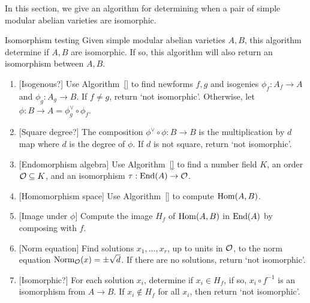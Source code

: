 In this section, we give an algorithm for determining when a pair of simple
modular abelian varieties are isomorphic.

\begin{algorithm}{Isomorphism testing}%
    \label{alg:isomorphism_testing}
    Given simple modular abelian varieties $A, B$, this algorithm determine if
    $A, B$ are isomorphic. If so, this algorithm will also return an
    isomorphism between $A, B$.
    \begin{enumerate}
        \item{}
            [Isogenous?] Use Algorithm~\ref{} to find newforms $f,g$ and
            isogenies $\phi_f:A_f\to A$ and $\phi_g:A_g\to B$. If $f\neq g$,
            return `not isomorphic'. Otherwise, let $\phi:B\to A=\phi_g ^\vee
            \circ \phi_f$.
        \item{}
            [Square degree?] The composition $\phi^\vee \circ \phi:B\to B$ is
            the multiplication by $d$ map where $d$ is the degree of $\phi$. If
            $d$ is not square, return `not isomorphic'.
        \item{}
            [Endomorphism algebra] Use Algorithm~\ref{} to find a number field
            $K$, an order $\mathcal{O}\subseteq K$, and an isomorphism $\tau:\operatorname{End}(A)\to
            \mathcal{O}$.
        \item{}
            [Homomorphism space] Use Algorithm~\ref{} to compute $\operatorname{Hom}(A,B)$.
        \item{}
            [Image under $\phi$] Compute the image $H_f$ of $\operatorname{Hom}(A, B)$ in
            $\operatorname{End}(A)$ by composing with $f$.
        \item{}
            [Norm equation] Find solutions $x_1,\ldots,x_r$, up to units in
            $\mathcal{O}$, to the norm equation $\operatorname{Norm}_{\mathcal{O}} (x) = \pm \sqrt{d}$. If
            there are no solutions, return `not isomorphic'.
        \item{}
            [Isomorphic?] For each solution $x_i$, determine if $x_i\in H_f$,
            if so, $x_i \circ f^{-1}$ is an isomorphism from $A\to B$. If
            $x_i\notin H_f$ for all $x_i$, then return `not isomorphic'.
    \end{enumerate}
\end{algorithm}
